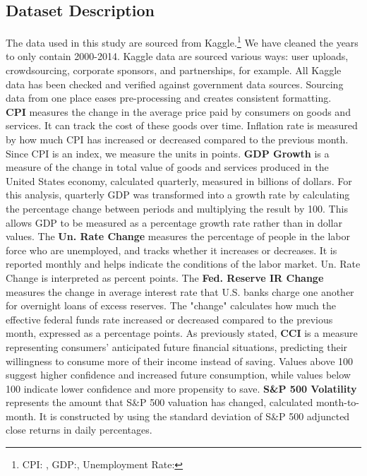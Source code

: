 \subsection{Dataset Description}
The data used in this study are sourced from Kaggle.\footnote{CPI: \cite{KondoroCPI}, GDP:\cite{KondoroGDP}, Unemployment Rate:\cite{KondoroUnemployment}} We have cleaned the years to only contain 2000-2014. Kaggle data are sourced various ways: user uploads, crowdsourcing, corporate sponsors, and partnerships, for example. All Kaggle data has been checked and verified against government data sources. Sourcing data from one place eases pre-processing and creates consistent formatting. \\
\indent \textbf{CPI} measures the change in the average price paid by consumers on goods and services. It can track the cost of these goods over time. Inflation rate is measured by how much CPI has increased or decreased compared to the previous month. Since CPI is an index, we measure the units in points. \textbf{GDP Growth} is a measure of the change in total value of goods and services produced in the United States economy, calculated quarterly, measured in billions of dollars. For this analysis, quarterly GDP was transformed into a growth rate by calculating the percentage change between periods and multiplying the result by 100. This allows GDP to be measured as a percentage growth rate rather than in dollar values. The \textbf{Un. Rate Change} measures the percentage of people in the labor force who are unemployed, and tracks whether it increases or decreases. It is reported monthly and helps indicate the conditions of the labor market. Un. Rate Change is interpreted as percent points. The \textbf{Fed. Reserve IR Change} measures the change in average interest rate that U.S. banks charge one another for overnight loans of excess reserves. The "change" calculates how much the effective federal funds rate increased or decreased compared to the previous month, expressed as a percentage points. As previously stated, \textbf{CCI} is a measure representing consumers’ anticipated future financial situations, predicting their willingness to consume more of their income instead of saving. Values above 100 suggest higher confidence and increased future consumption, while values below 100 indicate lower confidence and more propensity to save. \textbf{S\&P 500 Volatility} represents the amount that S\&P 500 valuation has changed, calculated month-to-month. It is constructed by using the standard deviation of S\&P 500 adjuncted close returns in daily percentages. 
